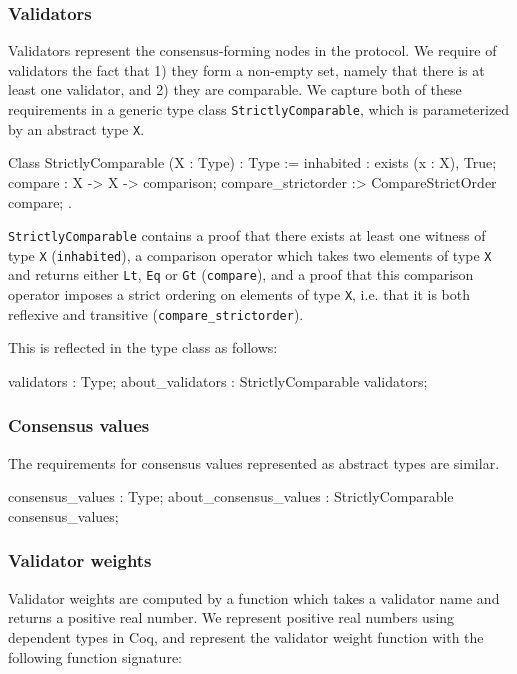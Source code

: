 \documentclass[runningheads]{llncs}
\begin{document}
\subsubsection{Validators} 
Validators represent the consensus-forming nodes in the protocol. We require of validators the fact that 1) they form a non-empty set, namely that there is at least one validator, and 2) they are comparable. We capture both of these requirements in a generic type class \verb|StrictlyComparable|, which is parameterized by an abstract type \verb|X|. 
\begin{coq}
	Class StrictlyComparable (X : Type) : Type :=
	{
	inhabited : exists (x : X), True;
	compare : X -> X -> comparison;
	compare_strictorder :> CompareStrictOrder compare;
	}.
\end{coq}
\verb|StrictlyComparable| contains a proof that there exists at least one witness of type \verb|X| (\verb|inhabited|), a comparison operator which takes two elements of type \verb|X| and returns either \verb|Lt|, \verb|Eq| or \verb|Gt| (\verb|compare|), and a proof that this comparison operator imposes a strict ordering on elements of type \verb|X|, i.e. that it is both reflexive and transitive (\verb|compare_strictorder|). 

This is reflected in the type class as follows: 
\begin{coq}
	validators : Type; 
	about_validators : StrictlyComparable validators;
\end{coq}

\subsubsection{Consensus values} 
The requirements for consensus values represented as abstract types are similar. 
\begin{coq}
	consensus_values : Type; 
	about_consensus_values : StrictlyComparable consensus_values; 
\end{coq}

\subsubsection{Validator weights} 
Validator weights are computed by a function which takes a validator name and returns a positive real number. We represent positive real numbers using dependent types in Coq, and represent the validator weight function with the following function signature: 
\end{document}
